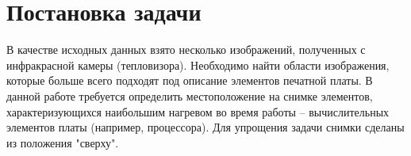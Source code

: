 \section{Постановка задачи}


В качестве исходных данных взято несколько изображений, полученных с инфракрасной камеры (тепловизора). Необходимо найти области изображения, которые больше всего подходят под описание элементов печатной платы. В данной работе требуется определить местоположение на снимке элементов, характеризующихся наибольшим нагревом во время работы -- вычислительных элементов платы (например, процессора).
Для упрощения задачи снимки сделаны из положения "сверху".